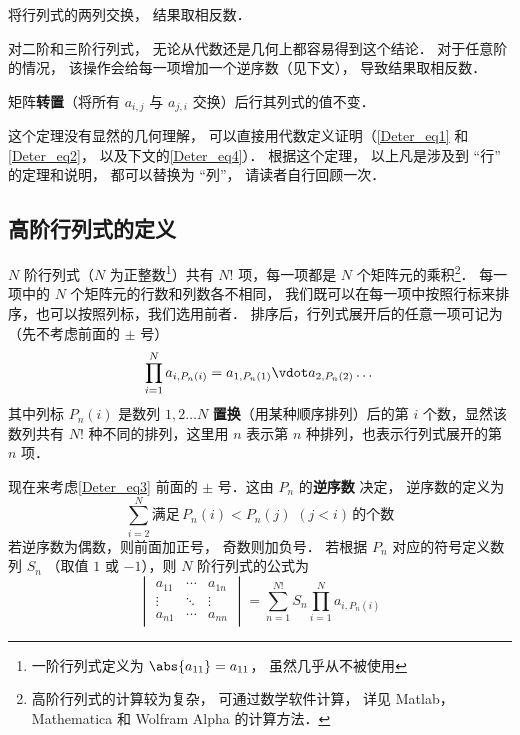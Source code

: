 \begin{theorem}{ }
将行列式的两列交换， 结果取相反数．
\end{theorem}
对二阶和三阶行列式， 无论从代数还是几何上都容易得到这个结论． 对于任意阶的情况， 该操作会给每一项增加一个逆序数（见下文）， 导致结果取相反数．

\begin{theorem}{ }
矩阵\textbf{转置}（将所有 $a_{i,j}$ 与 $a_{j,i}$ 交换）后行其列式的值不变．
\end{theorem}
这个定理没有显然的几何理解， 可以直接用代数定义证明（\autoref{Deter_eq1} 和\autoref{Deter_eq2}， 以及下文的\autoref{Deter_eq4}）． 根据这个定理， 以上凡是涉及到 “行” 的定理和说明， 都可以替换为 “列”， 请读者自行回顾一次．

\subsection{高阶行列式的定义}

$N$ 阶行列式（$N$ 为正整数\footnote{一阶行列式定义为 $\abs{a_{11}}=a_{11}$， 虽然几乎从不被使用}）共有 $N!$ 项，每一项都是 $N$ 个矩阵元的乘积\footnote{高阶行列式的计算较为复杂， 可通过数学软件计算， 详见 Matlab，Mathematica 和 Wolfram Alpha 的计算方法．%
}． 每一项中的 $N$ 个矩阵元的行数和列数各不相同， 我们既可以在每一项中按照行标来排序，也可以按照列标，我们选用前者． 排序后，行列式展开后的任意一项可记为（先不考虑前面的 $\pm$ 号）
\begin{equation}\label{Deter_eq3}
\prod_{i=1}^N a_{i,P_n(i)} = 
a_{1,P_n(1)} \vdot a_{2,P_n(2)} \dots
\end{equation}
其中列标 ${P_n}(i)$ 是数列 $1,2 \dots N$ \textbf{置换}（用某种顺序排列）后的第 $i$ 个数，显然该数列共有 $N!$ 种不同的排列，这里用 $n$ 表示第 $n$ 种排列，也表示行列式展开的第 $n$ 项．

现在来考虑\autoref{Deter_eq3} 前面的 $\pm$ 号．这由 $P_n$ 的\textbf{逆序数} 决定， 逆序数的定义为
\begin{equation}
\sum_{i=2}^N \text{满足}\, P_n(i) < P_n(j) \,\, (j<i) \,\text{的个数} 
\end{equation}
若逆序数为偶数，则前面加正号， 奇数则加负号． 若根据 $P_n$ 对应的符号定义数列 $S_n$ （取值 $1$ 或 $-1$），则 $N$ 阶行列式的公式为
\begin{equation}\label{Deter_eq4}
\begin{vmatrix}
a_{11} & \cdots & a_{1n} \\
\vdots & \ddots & \vdots \\
a_{n1} & \cdots & a_{nn}
\end{vmatrix}
= \sum_{n=1}^{N!} S_n \prod_{i=1}^N a_{i,P_n(i)}
\end{equation}


